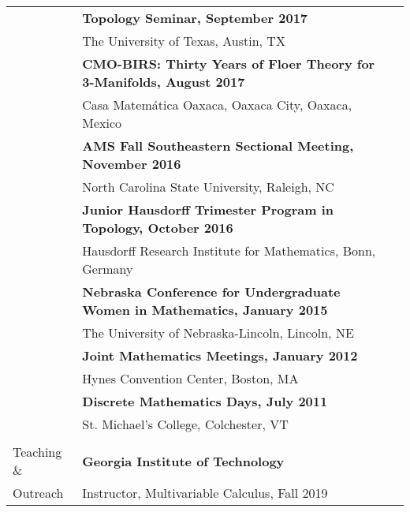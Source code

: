 \documentclass[letterpaper,11pt,oneside]{article}
\begin{document}
\begin{tabular}{@{} l l l}
     


     &\textbf{Topology Seminar, September 2017} \\
     &  The University of Texas, Austin, TX \\
 
 

     &\textbf{CMO-BIRS: Thirty Years of Floer Theory for 3-Manifolds, August 2017 } \\
     &  Casa Matem\'{a}tica Oaxaca, Oaxaca City, Oaxaca, Mexico\\

 

     &\textbf{AMS Fall Southeastern Sectional Meeting, November 2016 } \\
     &  North Carolina State University, Raleigh, NC \\
 
     

     &\textbf{Junior Hausdorff Trimester Program in Topology, October 2016 } \\
     &  Hausdorff Research Institute for Mathematics, Bonn, Germany \\
    

&\textbf{Nebraska Conference for Undergraduate Women in Mathematics, January 2015 } \\
     &  The University of Nebraska-Lincoln, Lincoln, NE \\
    
     
&\textbf{Joint Mathematics Meetings, January 2012} \\
     &  Hynes Convention Center, Boston, MA \\
     
     
     &\textbf{Discrete Mathematics Days, July 2011} \\
     &   St. Michael's College, Colchester, VT \\

     \\
 
  \Large{Teaching \& }   & \textbf{Georgia Institute of Technology} \\
    \Large{Outreach}       & Instructor, Multivariable Calculus, Fall 2019 \\   
    

\end{tabular}
\end{document}

